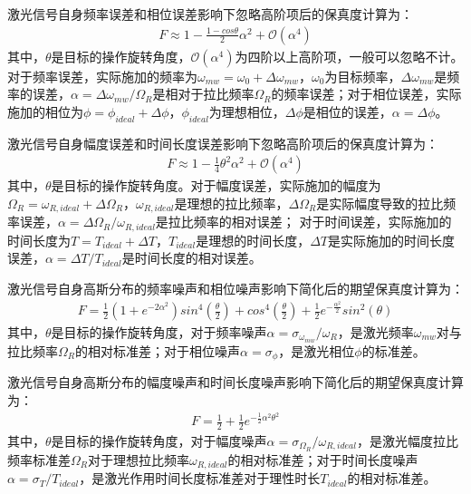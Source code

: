 激光信号自身频率误差和相位误差影响下忽略高阶项后的保真度计算为：
\begin{align}
    F\approx1-\frac{1-cos{\theta}}{2}\alpha^2+\mathcal{O}\left(\alpha^4\right)
\end{align}
其中，$\theta$是目标的操作旋转角度，$\mathcal{O}\left(\alpha^4\right)$为四阶以上高阶项，一般可以忽略不计。对于频率误差，实际施加的频率为$\omega_{mw}=\omega_0+\Delta\omega_{mw}$，$\omega_0$为目标频率，$\Delta\omega_{mw}$是频率的误差，$\alpha=\Delta\omega_{mw}/\Omega_R$是相对于拉比频率$\Omega_R$的频率误差；对于相位误差，实际施加的相位为$\phi=\phi_{ideal}+\Delta\phi$，$\phi_{ideal}$为理想相位，$\Delta\phi$是相位的误差，$\alpha=\Delta\phi$。

激光信号自身幅度误差和时间长度误差影响下忽略高阶项后的保真度计算为：
\begin{align}
    F\approx 1-\frac{1}{4}\theta^2\alpha^2+\mathcal{O}\left(\alpha^4\right)
\end{align}
其中，$\theta$是目标的操作旋转角度。对于幅度误差，实际施加的幅度为$\Omega_R=\omega_{R,ideal}+\Delta\Omega_R$，$\omega_{R,ideal}$是理想的拉比频率，$\Delta\Omega_R$是实际幅度导致的拉比频率误差，$\alpha=\Delta\Omega_R/\omega_{R,ideal}$是拉比频率的相对误差；
对于时间误差，实际施加的时间长度为$T=T_{ideal}+\Delta T$，$T_{ideal}$是理想的时间长度，$\Delta T$是实际施加的时间长度误差，$\alpha=\Delta T/T_{ideal}$是时间长度的相对误差。

激光信号自身高斯分布的频率噪声和相位噪声影响下简化后的期望保真度计算为：
\begin{align}
    F=\frac{1}{2}\left(1+e^{-2\alpha^2}\right) sin^4\left(\frac{\theta}{2}\right)+cos^4\left(\frac{\theta}{2}\right)+\frac{1}{2} e^{-\frac{\alpha^2}{2}} sin^2\left(\theta\right)\label{eq:frequency_noise_fidelity}
\end{align}
其中，$\theta$是目标的操作旋转角度，对于频率噪声$\alpha=\sigma_{\omega_{mw}}/\omega_{R}$，是激光频率$\omega_{mw}$对与拉比频率$\Omega_R$的相对标准差；对于相位噪声$\alpha=\sigma_{\phi}$，是激光相位$\phi$的标准差。

激光信号自身高斯分布的幅度噪声和时间长度噪声影响下简化后的期望保真度计算为：
\begin{align}
    F=\frac{1}{2}+\frac{1}{2} e^{-\frac{1}{2}\alpha^2\theta^2}\label{eq:amplitude_noise_fidelity}
\end{align}
其中，$\theta$是目标的操作旋转角度，对于幅度噪声$\alpha=\sigma_{\Omega_R}/\omega_{R,ideal}$，是激光幅度拉比频率标准差$\Omega_R$对于理想拉比频率$\omega_{R,ideal}$的相对标准差；对于时间长度噪声$\alpha=\sigma_{T}/T_{ideal}$，是激光作用时间长度标准差对于理性时长$T_{ideal}$的相对标准差。

